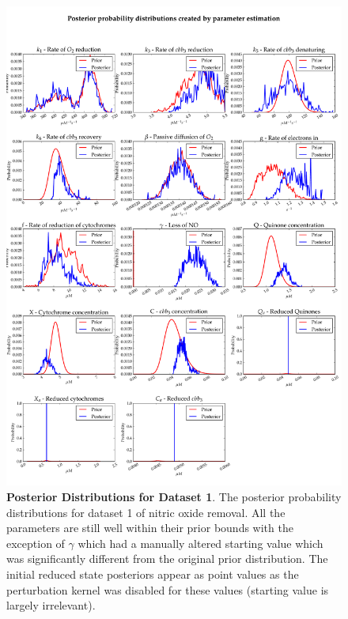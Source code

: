 \begin{figure}[p]
 \centering
 \includegraphics[width=15cm, trim=0cm 0cm 0cm 0cm]{./06-noreduction/data/posteriors-1.pdf}
 \caption[Posterior Distributions for Dataset 1]{{\bf Posterior Distributions for Dataset 1}. The posterior probability distributions for dataset 1 of nitric oxide removal. All the parameters are still well within their prior bounds with the exception of $\gamma$ which had a manually altered starting value which was significantly different from the original prior distribution. The initial reduced state posteriors appear as point values as the perturbation kernel was disabled for these values (starting value is largely irrelevant).
 \label{fig:dataset1posterior1}}
\end{figure}

